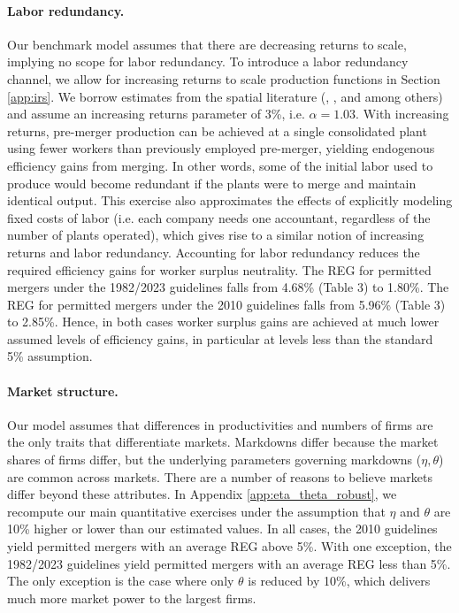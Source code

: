\documentclass[12pt]{article}
\theoremstyle{prop}
\begin{document}
\paragraph{Labor redundancy.} 
Our benchmark model assumes that there are decreasing returns to scale, implying no scope for labor redundancy.
To introduce a labor redundancy channel,  we allow for increasing returns to scale production functions in Section \ref{app:irs}.
We borrow estimates from the spatial literature (\citet{ciccone1993productivity}, \citet{davis2014macroeconomic}, and \citet{herkenhoff2018tarnishing} among others) and assume an increasing returns parameter of 3\%, i.e. $\alpha=1.03$.  
With increasing returns, pre-merger production can be achieved at a single consolidated plant using fewer workers than previously employed pre-merger, yielding endogenous efficiency gains from merging. 
In other words, some of the initial labor used to produce would become redundant if the plants were to merge and maintain identical output. 
This exercise also approximates the effects of explicitly modeling fixed costs of labor (i.e. each company needs one accountant, regardless of the number of plants operated), which gives rise to a similar notion of increasing returns and labor redundancy. 
Accounting for labor redundancy reduces the required efficiency gains for worker surplus neutrality. 
The REG for permitted mergers under the 1982/2023 guidelines falls from 4.68\% (Table 3) to 1.80\%.
The REG for permitted mergers under the 2010 guidelines falls from 5.96\% (Table 3) to 2.85\%. 
Hence, in both cases worker surplus gains are achieved at much lower assumed levels of efficiency gains, in particular at levels less than the standard 5\% assumption. 

\paragraph{Market structure.} 
Our model assumes that differences in productivities and numbers of firms are the only traits that differentiate markets. 
Markdowns differ because the market shares of firms differ, but the underlying parameters governing markdowns ($\eta,\theta$) are common across markets. 
There are a number of reasons to believe markets differ beyond these attributes.
In Appendix \ref{app:eta_theta_robust}, we  recompute our main quantitative exercises under the assumption that $\eta$ and $\theta$ are 10\% higher or lower than our estimated values. 
In all cases, the 2010 guidelines yield permitted mergers with an average REG above 5\%. 
With one exception, the 1982/2023 guidelines yield permitted mergers with an average REG less than 5\%.
The only exception is the case where only $\theta$ is reduced by 10\%, which delivers much more market power to the largest firms. 
\end{document}
